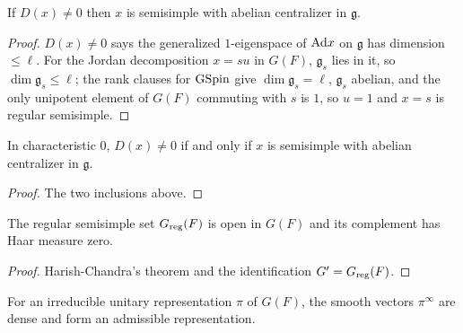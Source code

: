 \begin{lemma}
\label{mem_regularSet_of_hcDisc_ne_zero}
\leanok
{}
If $D(x)\neq0$ then $x$ is semisimple with abelian centralizer in $\mathfrak g$.
\end{lemma}
\begin{proof}
\leanok
{}
$D(x)\neq0$ says the generalized $1$-eigenspace of $\mathrm{Ad} x$ on $\mathfrak g$ has dimension $\le\ell$. For the Jordan decomposition $x=su$ in $G(F)$, $\mathfrak g_s$ lies in it, so $\dim\mathfrak g_s\le\ell$; the rank clauses for $\mathrm{GSpin}$ give $\dim\mathfrak g_s=\ell$, $\mathfrak g_s$ abelian, and the only unipotent element of $G(F)$ commuting with $s$ is $1$, so $u=1$ and $x=s$ is regular semisimple.
\end{proof}

\begin{theorem}[$G'=\Greg(F)$]
\label{hcDisc_ne_zero_iff_mem_regularSet}
\leanok
{}
In characteristic $0$, $D(x)\neq0$ if and only if $x$ is semisimple with abelian centralizer in $\mathfrak g$.
\end{theorem}
\begin{proof}
\leanok
{}
The two inclusions above.
\end{proof}

\begin{theorem}
\label{hc_regularSet_open_conull}
\leanok
{}
The regular semisimple set $G_{\mathrm{reg}}(F)$ is open in $G(F)$ and its complement has Haar measure zero.
\end{theorem}
\begin{proof}
\leanok
{}
Harish-Chandra's theorem and the identification $G'=\Greg(F)$.
\end{proof}

\begin{literature}
\label{LIT-cartier_smoothVectors_dense_admissible}
\leanok
{}
For an irreducible unitary representation $\pi$ of $G(F)$, the smooth vectors $\pi^\infty$ are dense and
form an admissible representation.

\end{literature}

